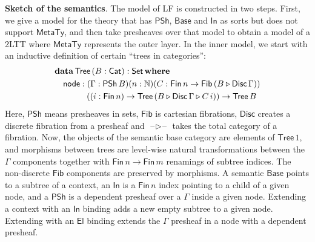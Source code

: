 \documentclass{easychair}
\newcommand{\msf}[1]{{\mathsf{#1}}}
\newcommand{\mbf}[1]{{\mathbf{#1}}}
\newcommand{\mbb}[1]{\mathbb{#1}}
\newcommand{\ext}{\triangleright}
\newcommand{\blank}{{\mathord{\hspace{1pt}\text{--}\hspace{1pt}}}}
\newcommand{\MetaTy}{\msf{MetaTy}}
\newcommand{\Base}{\msf{Base}}
\newcommand{\PSh}{\msf{PSh}}
\newcommand{\El}{\msf{El}}
\newcommand{\Cat}{\msf{Cat}}
\newcommand{\In}{\msf{In}}
\newcommand{\Fib}{\msf{Fib}}
\newcommand{\Fin}{\msf{Fin}}
\newcommand{\Tree}{\msf{Tree}}
\newcommand{\Disc}{\msf{Disc}}
\begin{document}
\noindent \textbf{Sketch of the semantics}. The model of LF is constructed in
two steps. First, we give a model for the theory that has $\PSh$, $\Base$ and
$\In$ as sorts but does not support $\MetaTy$, and then take presheaves over
that model to obtain a model of a 2LTT where $\MetaTy$ represents the outer
layer. In the inner model, we start with an inductive definition of certain
``trees in categories'':
\begin{alignat*}{3}
  & \mbf{data}\,\Tree\,(B : \Cat) : \msf{Set}\,\mbf{where}\\
  & \hspace{1em} \msf{node} : (\Gamma : \PSh\,B)(n : \mbb{N})(C : \Fin\,n \to \Fib\,(B \ext \Disc\,\Gamma))\\
  & \hspace{3.8em} ((i : \Fin\,n) \to \Tree\,(B \ext \Disc\,\Gamma \ext C\,i)) \to \Tree\,B
\end{alignat*}
Here, $\PSh$ means presheaves in sets, $\Fib$ is cartesian fibrations, $\Disc$
creates a discrete fibration from a presheaf and $\blank\!\ext\!\blank$ takes
the total category of a fibration. Now, the objects of
the semantic base category are elements of $\Tree\,1$, and morphisms between
trees are level-wise natural transformations between the $\Gamma$ components
together with $\Fin\,n \to \Fin\,m$ renamings of subtree indices. The
non-discrete $\Fib$ components are preserved by morphisms. A semantic $\Base$
points to a subtree of a context, an $\In$ is a $\Fin\,n$ index pointing to a
child of a given node, and a $\PSh$ is a dependent presheaf over a $\Gamma$ inside a
given node. Extending a context with an $\In$ binding adds a new empty subtree
to a given node. Extending with an $\El$ binding extends the $\Gamma$ presheaf
in a node with a dependent presheaf.



\end{document}
